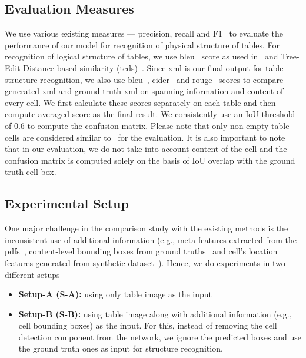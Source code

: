 \documentclass[runningheads]{llncs}
\begin{document}
\subsection{Evaluation Measures} \label{evaluation_measure}

We use various existing measures --- precision, recall and F1~\cite{chi2019complicated,gobel2013icdar,shahab2010open} to evaluate the performance of our model for recognition of physical structure of tables. For recognition of logical structure of tables, we use {\sc bleu}~\cite{papineni2002bleu} score as used in~\cite{li2019tablebank} and Tree-Edit-Distance-based similarity ({\sc teds})~\cite{zhong2019image}. Since {\sc xml} is our final output for table structure recognition, we also use {\sc bleu}~\cite{papineni2002bleu}, {\sc cide}r~\cite{vedantam2015cider} and {\sc rouge}~\cite{lin2004rouge} scores to compare generated {\sc xml} and ground truth {\sc xml} on spanning information and content of every cell. We first calculate these scores separately on each table and then compute averaged score as the final result. We consistently use an IoU threshold of 0.6 to compute the confusion matrix. Please note that only non-empty table cells are considered similar to~\cite{gobel2013icdar} for the evaluation. It is also important to note that in our evaluation, we do not take into account content of the cell and the confusion matrix is computed solely on the basis of IoU overlap with the ground truth cell box.

\subsection{Experimental Setup} \label{experimental_setup}

One major challenge in the comparison study with the existing methods is the inconsistent use of additional information (e.g., meta-features extracted from the {\sc pdf}s~\cite{table_splitting}, content-level bounding boxes from ground truths~\cite{paliwal2019tablenet,chi2019complicated} and cell's location features generated from synthetic dataset~\cite{qasim2019rethinking}). Hence, we do experiments in two different setups 
\begin{itemize}
    \item \textbf{Setup-A (S-A):} using only table image as the input
    \item \textbf{Setup-B (S-B):} using table image along with additional information (e.g., cell bounding boxes) as the input. For this, instead of removing the cell detection component from the network, we ignore the predicted boxes and use the ground truth ones as input for structure recognition.
\end{itemize}
\end{document}
